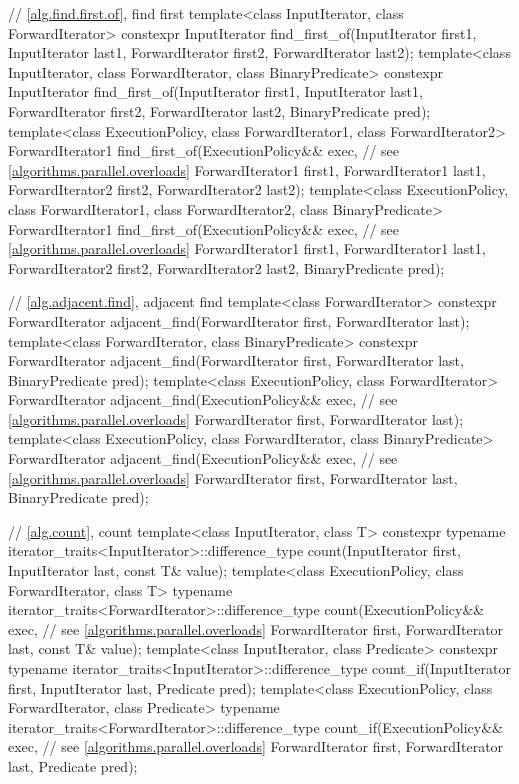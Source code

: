 \begin{codeblock}
{  // \ref{alg.find.first.of}, find first
  template<class InputIterator, class ForwardIterator>
    constexpr InputIterator
      find_first_of(InputIterator first1, InputIterator last1,
                    ForwardIterator first2, ForwardIterator last2);
  template<class InputIterator, class ForwardIterator, class BinaryPredicate>
    constexpr InputIterator
      find_first_of(InputIterator first1, InputIterator last1,
                    ForwardIterator first2, ForwardIterator last2,
                    BinaryPredicate pred);
  template<class ExecutionPolicy, class ForwardIterator1, class ForwardIterator2>
    ForwardIterator1
      find_first_of(ExecutionPolicy&& exec, // see \ref{algorithms.parallel.overloads}
                    ForwardIterator1 first1, ForwardIterator1 last1,
                    ForwardIterator2 first2, ForwardIterator2 last2);
  template<class ExecutionPolicy, class ForwardIterator1,
           class ForwardIterator2, class BinaryPredicate>
    ForwardIterator1
      find_first_of(ExecutionPolicy&& exec, // see \ref{algorithms.parallel.overloads}
                    ForwardIterator1 first1, ForwardIterator1 last1,
                    ForwardIterator2 first2, ForwardIterator2 last2,
                    BinaryPredicate pred);

  // \ref{alg.adjacent.find}, adjacent find
  template<class ForwardIterator>
    constexpr ForwardIterator
      adjacent_find(ForwardIterator first, ForwardIterator last);
  template<class ForwardIterator, class BinaryPredicate>
    constexpr ForwardIterator
      adjacent_find(ForwardIterator first, ForwardIterator last,
                    BinaryPredicate pred);
  template<class ExecutionPolicy, class ForwardIterator>
    ForwardIterator
      adjacent_find(ExecutionPolicy&& exec, // see \ref{algorithms.parallel.overloads}
                    ForwardIterator first, ForwardIterator last);
  template<class ExecutionPolicy, class ForwardIterator, class BinaryPredicate>
    ForwardIterator
      adjacent_find(ExecutionPolicy&& exec, // see \ref{algorithms.parallel.overloads}
                    ForwardIterator first, ForwardIterator last,
                    BinaryPredicate pred);

  // \ref{alg.count}, count
  template<class InputIterator, class T>
    constexpr typename iterator_traits<InputIterator>::difference_type
      count(InputIterator first, InputIterator last, const T& value);
  template<class ExecutionPolicy, class ForwardIterator, class T>
    typename iterator_traits<ForwardIterator>::difference_type
      count(ExecutionPolicy&& exec, // see \ref{algorithms.parallel.overloads}
            ForwardIterator first, ForwardIterator last, const T& value);
  template<class InputIterator, class Predicate>
    constexpr typename iterator_traits<InputIterator>::difference_type
      count_if(InputIterator first, InputIterator last, Predicate pred);
  template<class ExecutionPolicy, class ForwardIterator, class Predicate>
    typename iterator_traits<ForwardIterator>::difference_type
      count_if(ExecutionPolicy&& exec, // see \ref{algorithms.parallel.overloads}
               ForwardIterator first, ForwardIterator last, Predicate pred);

}
\end{codeblock}
